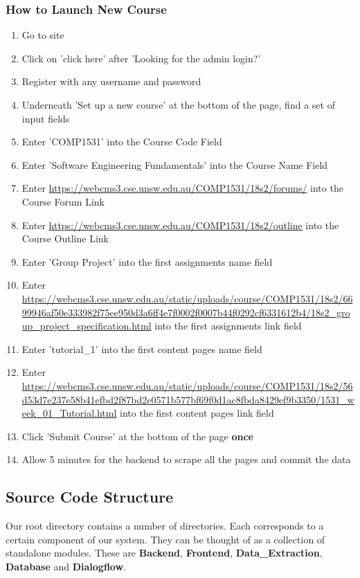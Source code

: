 \subsubsection{How to Launch New Course}
\begin{enumerate}
	\item{Go to site}
	\item{Click on 'click here' after 'Looking for the admin login?'}
	\item{Register with any username and password}
	\item{Underneath 'Set up a new course' at the bottom of the page, find a set of input fields}
	\item{Enter 'COMP1531' into the Course Code Field}
	\item{Enter 'Software Engineering Fundamentals' into the Course Name Field}
	\item{Enter \url{https://webcms3.cse.unsw.edu.au/COMP1531/18s2/forums/} into the Course Forum Link}
	\item{Enter \url{https://webcms3.cse.unsw.edu.au/COMP1531/18s2/outline} into the Course Outline Link}
	\item{Enter 'Group Project' into the first assignments name field}
	\item{Enter \url{https://webcms3.cse.unsw.edu.au/static/uploads/course/COMP1531/18s2/6699946af50e333982f75ee950d3a6ff4e7f0002f0007b44f0292cf6331612b4/18s2\_group\_project\_specification.html} into the first assignments link field}
	\item{Enter 'tutorial\_1' into the first content pages name field}
	\item{Enter \url{https://webcms3.cse.unsw.edu.au/static/uploads/course/COMP1531/18s2/56d53d7e237e58b41efbd2f87bd2e0571b577bf69f0d1ac8fbda8429ef9b3350/1531\_week\_01\_Tutorial.html} into the first content pages link field}	
    \item{Click 'Submit Course' at the bottom of the page \textbf{once}}
	\item{Allow 5 minutes for the backend to scrape all the pages and commit the data}
\end{enumerate}

\subsection{Source Code Structure}
Our root directory contains a number of directories. Each corresponds to a certain component of our system. They can be thought of as a collection of standalone modules. These are \textbf{Backend}, \textbf{Frontend}, \textbf{Data\_Extraction}, \textbf{Database} and \textbf{Dialogflow}.

